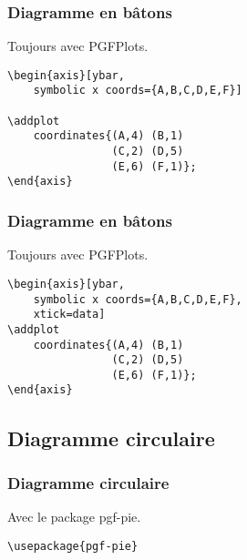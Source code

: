 \documentclass{clic_latex_beamer}
\begin{document}
\begin{frame}[fragile]
\frametitle{Diagramme en bâtons}
Toujours avec PGFPlots.
\begin{multicols}{2}


\columnbreak

\begin{lstlisting}
\begin{axis}[ybar,
    symbolic x coords={A,B,C,D,E,F}]
    
\addplot
    coordinates{(A,4) (B,1)
                (C,2) (D,5)
                (E,6) (F,1)};
\end{axis}
\end{lstlisting}

\end{multicols}

\end{frame}


\begin{frame}[fragile]
\frametitle{Diagramme en bâtons}
Toujours avec PGFPlots.
\begin{multicols}{2}


\columnbreak

\begin{lstlisting}
\begin{axis}[ybar,
    symbolic x coords={A,B,C,D,E,F},
    xtick=data]
\addplot
    coordinates{(A,4) (B,1)
                (C,2) (D,5)
                (E,6) (F,1)};
\end{axis}
\end{lstlisting}

\end{multicols}

\end{frame}

\subsection{Diagramme circulaire}
\begin{frame}[fragile]
\frametitle{Diagramme circulaire}
Avec le package pgf-pie.
\begin{lstlisting}
\usepackage{pgf-pie}
\end{lstlisting}
\end{frame}
\end{document}
